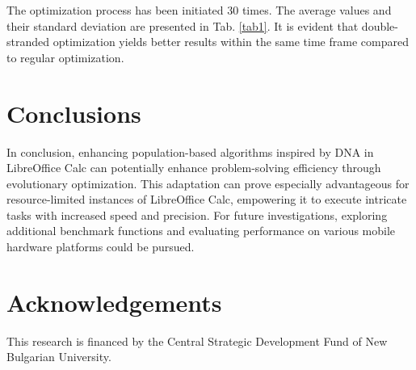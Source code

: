 \documentclass[runningheads]{llncs}
\begin{document}
The optimization process has been initiated 30 times. The average values and their standard deviation are presented in Tab. \ref{tab1}. It is evident that double-stranded optimization yields better results within the same time frame compared to regular optimization.

\section{Conclusions}

In conclusion, enhancing population-based algorithms inspired by DNA in LibreOffice Calc can potentially enhance problem-solving efficiency through evolutionary optimization. This adaptation can prove especially advantageous for resource-limited instances of LibreOffice Calc, empowering it to execute intricate tasks with increased speed and precision. For future investigations, exploring additional benchmark functions and evaluating performance on various mobile hardware platforms could be pursued.

\section*{Acknowledgements} This research is financed by the Central Strategic Development Fund of New Bulgarian University.
\end{document}
